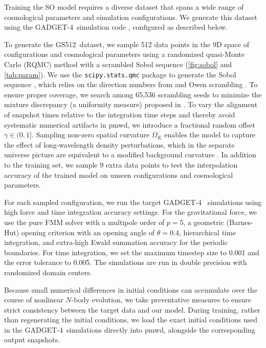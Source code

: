 \documentclass[modern, trackchanges, dvipsnames]{aastex631}
\newcommand{\pmwd}{{\usefont{T1}{nova}{m}{sl}pmwd}}
\newcommand{\GADGET}{{{\fontsize{10pt}{12pt}\selectfont GADGET}-4}}
\newcommand{\GSDATA}{{GS512}}
\newcommand{\OmegaK}{\Omega_K}
\begin{document}
Training the SO model requires a diverse dataset that spans a wide range of
cosmological parameters and simulation configurations.
We generate this dataset using the \GADGET\ simulation code \citep{GADGET-4},
configured as described below.

To generate the \GSDATA\ dataset, we sample 512 data points in the 9D space of
configurations and cosmological parameters using a randomized quasi-Monte Carlo
(RQMC) method with a scrambled Sobol sequence (\autoref{fig:sobol} and
\autoref{tab:param}).
We use the \texttt{scipy.stats.qmc} package \citep{SciPy} to generate
the Sobol sequence \citep{Sobol1967}, which relies on the direction numbers
from \citet{JoeKuo2008} and Owen scrambling \citep{Owen1998}.
To ensure proper coverage, we search among 65,536 scrambling seeds to minimize
the mixture discrepancy (a uniformity measure) proposed in \citet{Zhou2013MD}.
To vary the alignment of snapshot times relative to the integration time
steps and thereby avoid systematic numerical artifacts in \pmwd, we introduce a
fractional random offset $\gamma \in (0, 1]$.
Sampling non-zero spatial curvature $\OmegaK$ enables the model to capture the
effect of long-wavelength density perturbations, which in the separate universe
picture are equivalent to a modified background curvature
\citep{LiEtAl2014, WagnerEtAl2015}.
In addition to the training set, we sample 9 extra data points to test the
interpolation accuracy of the trained model on unseen configurations and
cosmological parameters.

For each sampled configuration, we run the target \GADGET\ \citep{GADGET-4}
simulations using high force and time integration accuracy settings.
For the gravitational force, we use the pure FMM solver with a multipole order
of $p=5$, a geometric (Barnes-Hut) opening criterion with an opening angle of
$\theta=0.4$, hierarchical time integration, and extra-high Ewald
summation accuracy for the periodic boundaries.
For time integration, we set the maximum timestep size to 0.001 and the
error tolerance to 0.005.
The simulations are run in double precision with randomized domain centers.

Because small numerical differences in initial conditions can accumulate
over the course of nonlinear $N$-body evolution, we take preventative measures
to ensure strict consistency between the target data and our model.
During training, rather than regenerating the initial conditions,
we load the exact initial conditions used in the \GADGET\ simulations directly
into \pmwd, alongside the corresponding output snapshots.
\end{document}
